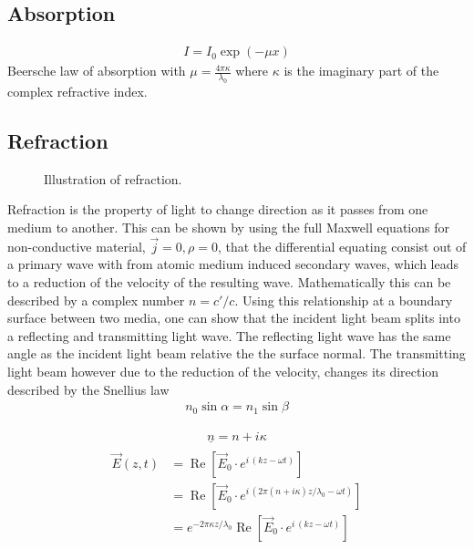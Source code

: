 \subsection{Absorption}
% 
\begin{align}
    I = I_0 \exp(-\mu x)
\end{align}
% 
Beersche law of absorption with $\mu = \frac{4\pi \kappa}{\lambda_0}$ where $\kappa$ is the imaginary part of the complex refractive index.
% 
\subsection{Refraction}
% 
\begin{figure}[!t]
\centering
\setlength{\tikzwidth}{\textwidth}
\label{fig:optic_refraction}
\caption{Illustration of refraction.}
\end{figure}
% 
Refraction is the property of light to change direction as it passes from one medium to another. This can be shown by using the full Maxwell equations  for non-conductive material, \ie{} $\vec{j} = 0, \rho = 0$, that the differential equating consist out of a primary wave with from atomic medium induced secondary waves, which leads to a reduction of the velocity of the resulting wave. Mathematically this can be described by a complex number $n = c' / c$.
Using this relationship at a boundary surface between two media, one can show that the incident light beam splits into a reflecting and transmitting light wave. The reflecting light wave has the same angle as the incident light beam relative the the surface normal. The transmitting light beam however due to the reduction of the velocity, changes its direction described by the Snellius law
\begin{align}
    n_0 \sin \alpha = n_1 \sin \beta
\end{align}

% 
\begin{align}
\underline{n} = n + i\kappa
\end{align}
% 
\begin{align}
\begin{split}
\vec{E}(z, t) &= \operatorname{Re}\! \left[\vec{E}_0 \cdot e^{i\, (kz - \omega t)}\right] \\
&= \operatorname{Re}\! \left[\vec{E}_0 \cdot e^{i\, (2\pi(n + i\kappa)z/\lambda_0 - \omega t)}\right] \\
&= e^{-2\pi \kappa z/\lambda_0} \operatorname{Re}\! \left[\vec{E}_0 \cdot e^{i\, (kz - \omega t)}\right]
\end{split}
\end{align}
% 
% 
% 
